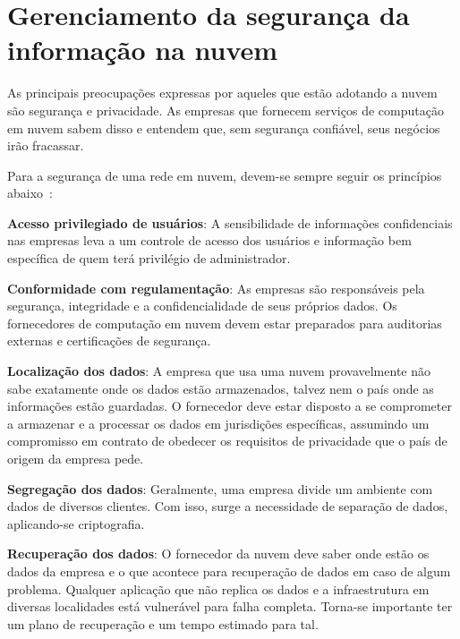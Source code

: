 \section{Gerenciamento da segurança da informação na nuvem}

As principais preocupações expressas por aqueles que estão adotando a nuvem são
segurança e privacidade. As empresas que fornecem serviços de computação em nuvem
sabem disso e entendem que, sem segurança confiável, seus negócios irão
fracassar.

Para a segurança de uma rede em nuvem, devem-se sempre seguir os princípios
abaixo~\cite{gartner-what-to-evaluate}:


\newcommand{\itemm}[1]{\item\textbf{#1}}

\begin{itemise}

    \itemm{Acesso privilegiado de usuários}: A sensibilidade de informações
    confidenciais nas empresas leva a um controle de acesso dos usuários e
    informação bem específica de quem terá privilégio de administrador.
    
    \itemm{Conformidade com regulamentação}: As empresas são responsáveis pela
    segurança, integridade e a confidencialidade de seus próprios dados. Os
    fornecedores de computação em nuvem devem estar preparados para auditorias
    externas e certificações de segurança.
    
    \itemm{Localização dos dados}: A empresa que usa uma nuvem provavelmente não
    sabe exatamente onde os dados estão armazenados, talvez nem o país onde as
    informações estão guardadas. O fornecedor deve estar disposto a se comprometer a
    armazenar e a processar os dados em jurisdições específicas, assumindo um
    compromisso em contrato de obedecer os requisitos de privacidade que o país de
    origem da empresa pede.
    
    \itemm{Segregação dos dados}: Geralmente, uma empresa divide um ambiente com
    dados de diversos clientes. Com isso, surge a necessidade de separação de dados,
    aplicando-se criptografia.
    
    \itemm{Recuperação dos dados}: O fornecedor da nuvem deve saber onde estão os
    dados da empresa e o que acontece para recuperação de dados em caso de algum
    problema. Qualquer aplicação que não replica os dados e a infraestrutura em 
    diversas localidades está vulnerável para falha completa. Torna-se importante
    ter um plano de recuperação e um tempo estimado para tal.
    

\end{itemise}
